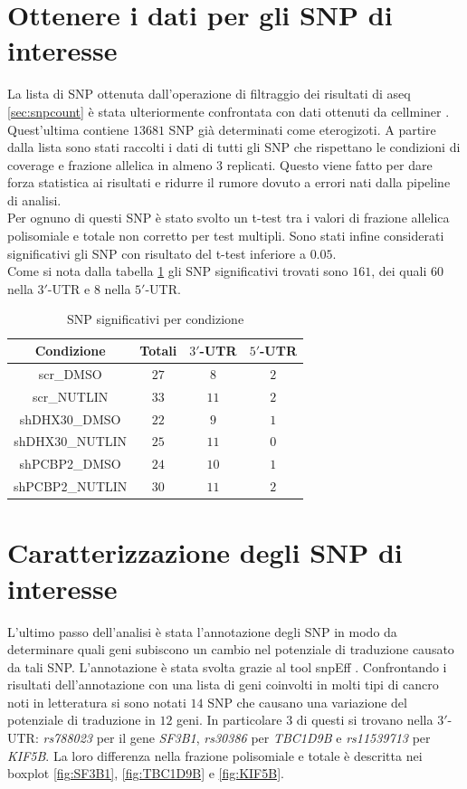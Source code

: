 \section{Ottenere i dati per gli SNP di interesse}
\label{sec:snp_filter}
La lista di SNP ottenuta dall'operazione di filtraggio dei risultati di aseq \ref{sec:snpcount} \`e stata ulteriormente confrontata con dati ottenuti da cellminer \cite{cellminer}.
Quest'ultima contiene $13681$ SNP gi\`a determinati come eterogizoti.
A partire dalla lista sono stati raccolti i dati di tutti gli SNP che rispettano le condizioni di coverage e frazione allelica in almeno $3$ replicati.
Questo viene fatto per dare forza statistica ai risultati e ridurre il rumore dovuto a errori nati dalla pipeline di analisi.\\
Per ognuno di questi SNP \`e stato svolto un t-test tra i valori di frazione allelica polisomiale e totale non corretto per test multipli.
Sono stati infine considerati significativi gli SNP con risultato del t-test inferiore a $0.05$.\\
Come si nota dalla tabella \ref{tab:significativesnp1} gli SNP significativi trovati sono $161$, dei quali $60$ nella $3'$-UTR e $8$ nella $5'$-UTR.
\begin{table}[H]
	\begin{tabular}{|c|c|c|c|}
		\hline
		Condizione & Totali & $3'$-UTR & $5'$-UTR\\
		\hline
		scr\_DMSO & $27$ & $8$ & $2$\\
		\hline
		scr\_NUTLIN & $33$ & $11$ & $2$\\
		\hline
		shDHX30\_DMSO & $22$ & $9$ & $1$\\
		\hline
		shDHX30\_NUTLIN & $25$ & $11$ & $0$\\
		\hline
		shPCBP2\_DMSO & $24$ & $10$ & $1$\\
		\hline
		shPCBP2\_NUTLIN & $30$ & $11$ & $2$\\
		\hline
	\end{tabular}
	\centering
	\label{tab:significativesnp1}
	\caption{SNP significativi per condizione}
\end{table}

\section{Caratterizzazione degli SNP di interesse}
L'ultimo passo dell'analisi \`e stata l'annotazione degli SNP in modo da determinare quali geni subiscono un cambio nel potenziale di traduzione causato da tali SNP.
L'annotazione \`e stata svolta grazie al tool snpEff \cite{snpeff}.
Confrontando i risultati dell'annotazione con una lista di geni coinvolti in molti tipi di cancro noti in letteratura si sono notati $14$ SNP che causano una variazione del potenziale di traduzione in $12$ geni.
In particolare $3$ di questi si trovano nella $3'$-UTR: \emph{rs788023} per il gene \emph{SF3B1}, \emph{rs30386} per \emph{TBC1D9B} e \emph{rs11539713} per \emph{KIF5B}.
La loro differenza nella frazione polisomiale e totale \`e descritta nei boxplot \ref{fig:SF3B1}, \ref{fig:TBC1D9B} e \ref{fig:KIF5B}.

